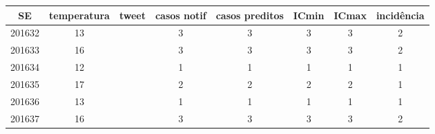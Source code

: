 \begin{tabular}{c|ccccccc}
  \hline
SE & temperatura & tweet & casos notif & casos preditos & ICmin & ICmax & incidência \\ 
  \hline
201632 & 13 &  & 3 & 3 & 3 & 3 & 2 \\ 
  201633 & 16 &  & 3 & 3 & 3 & 3 & 2 \\ 
  201634 & 12 &  & 1 & 1 & 1 & 1 & 1 \\ 
  201635 & 17 &  & 2 & 2 & 2 & 2 & 1 \\ 
  201636 & 13 &  & 1 & 1 & 1 & 1 & 1 \\ 
  201637 & 16 &  & 3 & 3 & 3 & 3 & 2 \\ 
   \hline
\end{tabular}
